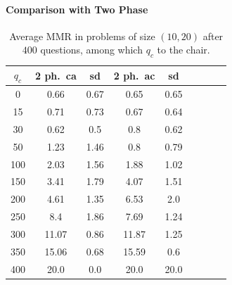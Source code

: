 \documentclass[sigconf, anonymous]{aamas}
\begin{document}
\paragraph{Comparison with Two Phase}

\begin{table}
	\caption{Average MMR in problems of size $(10, 20)$ after $400$ questions, among which $q_c$ to the chair.}
	\label{tab:twoP400}
	\begin{tabular}{S[table-figures-integer=3, table-number-alignment = right, table-figures-decimal=0]S[table-number-alignment = right]@{ ± }S[table-number-alignment = left]S[table-number-alignment = right]@{ ± }S[table-number-alignment = left]S[table-number-alignment = right]@{ ± }S[table-number-alignment = left]S[table-number-alignment = right]@{ ± }S[table-number-alignment = left]}
		\toprule
		{$q_c$} & {2 ph.\ ca} & {sd} & {2 ph.\ ac} & {sd} \\
		 & 0.66 & 0.67 & 0.65 & 0.65  \\
		15 & 0.71 & 0.73 & 0.67	& 0.64 \\
		30 & 0.62 & 0.5 & 0.8 & 0.62 \\
		50 & 1.23 & 1.46 & 0.8 & 0.79 \\
		100 & 2.03 & 1.56 & 1.88 & 1.02  \\
		150 & 3.41 & 1.79 & 4.07 & 1.51 \\
		200 & 4.61	& 1.35  & 6.53 & 2.0  \\
		250 & 8.4 & 1.86 & 	7.69 & 1.24 \\
		300 &11.07 & 0.86& 11.87 & 1.25 \\
		350 &15.06 & 0.68&15.59 & 0.6 \\
		400 &20.0 & 0.0 & 20.0 & 20.0 \\
		\bottomrule
	\end{tabular}
\end{table}

\end{document}
